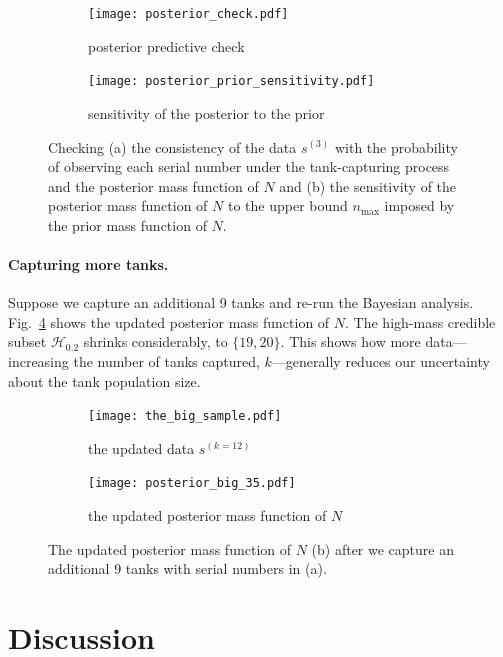 \documentclass[11pt, oneside]{article}
\begin{document}
  \begin{figure}[h!]
        	\centering
	\begin{subfigure}[b]{0.4\textwidth}
        		\texttt{[image: posterior\_check.pdf]}
        		\caption{posterior predictive check} \label{fig:posterior_checking}
        	\end{subfigure}
	
        	\begin{subfigure}[b]{\textwidth}
		\centering
		\texttt{[image: posterior\_prior\_sensitivity.pdf]}
        		\caption{sensitivity of the posterior to the prior} \label{fig:posterior_sensitivity}
        	\end{subfigure} 
            \caption{Checking (a) the consistency of the data $s^{(3)}$ with the probability of observing each serial number under the tank-capturing process and the posterior mass function of $N$ and (b) the sensitivity of the posterior mass function of $N$ to the upper bound $n_{\text{max}}$ imposed by the prior mass function of $N$.}
\end{figure}

\paragraph{Capturing more tanks.} Suppose we capture an additional 9 tanks and re-run the Bayesian analysis. Fig.~\ref{fig:moretanks} shows the updated posterior mass function of $N$. The high-mass credible subset $\mathcal{H}_{0.2}$ shrinks considerably, to $\{19, 20\}$. This shows how more data---increasing the number of tanks captured, $k$---generally reduces our uncertainty about the tank population size.

  \begin{figure}[h!]
        	\centering
	\begin{subfigure}[b]{0.5\textwidth}
        		\texttt{[image: the\_big\_sample.pdf]}
		\caption{the updated data $s^{(k=12)}$}
	\end{subfigure}
	\begin{subfigure}[b]{0.5\textwidth}
	 \texttt{[image: posterior\_big\_35.pdf]}
	 \caption{the updated posterior mass function of $N$}
	     	\end{subfigure}
            \caption{The updated posterior mass function of $N$ (b) after we capture an additional 9 tanks with serial numbers in (a).
            	} \label{fig:moretanks}
\end{figure}

\section{Discussion}
\end{document}
